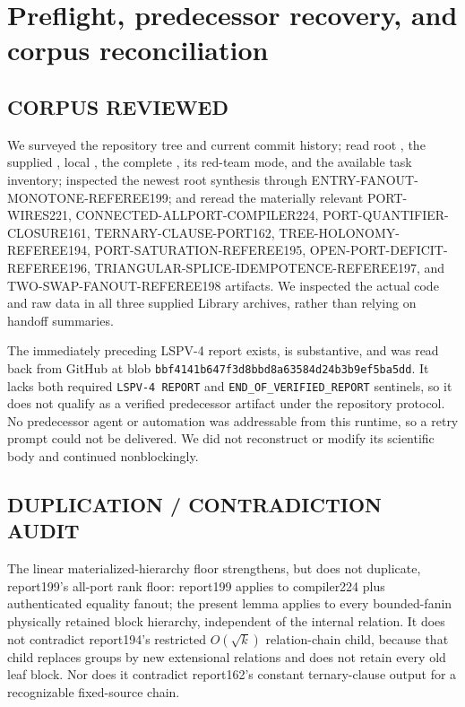 \documentclass[11pt]{article}
\begin{document}
\section{Preflight, predecessor recovery, and corpus reconciliation}
\subsection*{CORPUS REVIEWED}
We surveyed the repository tree and current commit history; read root
, the supplied , local , the
complete , its red-team mode, and
the available task inventory; inspected the newest root synthesis through
ENTRY-FANOUT-MONOTONE-REFEREE199; and reread the materially relevant
PORT-WIRES221, CONNECTED-ALLPORT-COMPILER224, PORT-QUANTIFIER-CLOSURE161,
TERNARY-CLAUSE-PORT162, TREE-HOLONOMY-REFEREE194,
PORT-SATURATION-REFEREE195, OPEN-PORT-DEFICIT-REFEREE196,
TRIANGULAR-SPLICE-IDEMPOTENCE-REFEREE197, and
TWO-SWAP-FANOUT-REFEREE198 artifacts.  We inspected the actual code and raw
data in all three supplied Library archives, rather than relying on handoff
summaries.

The immediately preceding LSPV-4 report
exists, is substantive, and was read back from GitHub at blob
\texttt{bbf4141b647f3d8bbd8a63584d24b3b9ef5ba5dd}.  It lacks both required
\texttt{LSPV-4 REPORT} and \texttt{END\_OF\_VERIFIED\_REPORT} sentinels, so
it does not qualify as a verified predecessor artifact under the repository
protocol.  No predecessor agent or automation was addressable from this
runtime, so a retry prompt could not be delivered.  We did not reconstruct or
modify its scientific body and continued nonblockingly.

\subsection*{DUPLICATION / CONTRADICTION AUDIT}
The linear materialized-hierarchy floor strengthens, but does not duplicate,
report199's all-port rank floor: report199 applies to compiler224 plus
authenticated equality fanout; the present lemma applies to every
bounded-fanin physically retained block hierarchy, independent of the
internal relation.  It does not contradict report194's restricted
$O(\sqrt{k})$ relation-chain child, because that child replaces groups by
new extensional relations and does not retain every old leaf block.  Nor does
it contradict report162's constant ternary-clause output for a recognizable
fixed-source chain.
\end{document}
